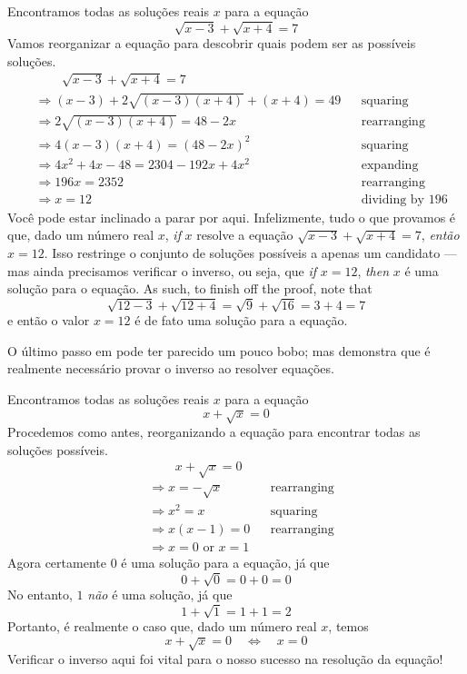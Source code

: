 \begin{estratégia}
\begin{example}
\label{exSolveSqrtFirstExample}
Encontramos todas as soluções reais $x$ para a equação
\[
\sqrt{x-3} + \sqrt{x+4} = 7
\]
Vamos reorganizar a equação para descobrir quais podem ser as possíveis soluções.
\begin{align*}
&\phantom{\Rightarrow\;\;} \sqrt{x-3} + \sqrt{x+4} = 7 && \\
&\Rightarrow (x-3) + 2\sqrt{(x-3)(x+4)} + (x+4) = 49 && \text{squaring} \\
&\Rightarrow 2\sqrt{(x-3)(x+4)} = 48-2x && \text{rearranging} \\
&\Rightarrow 4(x-3)(x+4) = (48-2x)^2 && \text{squaring} \\
&\Rightarrow 4x^2+4x-48 = 2304-192x+4x^2 && \text{expanding} \\
&\Rightarrow 196x = 2352 && \text{rearranging} \\
&\Rightarrow x=12 && \text{dividing by $196$}
\end{align*}
Você pode estar inclinado a parar por aqui. Infelizmente, tudo o que provamos é que, dado um número real $x$, \textit{if} $x$ resolve a equação $\sqrt{x-3} + \sqrt{x+4} = 7$, \textit {então} $x=12$. Isso restringe o conjunto de soluções possíveis a apenas um candidato --- mas ainda precisamos verificar o inverso, ou seja, que \textit{if} $x=12$, \textit{then} $x$ é uma solução para o equação.
As such, to finish off the proof, note that
\[
\sqrt{12-3} + \sqrt{12+4} = \sqrt{9} + \sqrt{16} = 3 + 4 = 7
\]
e então o valor $x=12$ é de fato uma solução para a equação.
\end{example}

O último passo em  pode ter parecido um pouco bobo; mas  demonstra que é realmente necessário provar o inverso ao resolver equações.

\begin{example}
\label{exSolveSqrtSecondExample}
Encontramos todas as soluções reais $x$ para a equação
\[
x+\sqrt{x}=0
\]
Procedemos como antes, reorganizando a equação para encontrar todas as soluções possíveis.
\begin{align*}
&\phantom{\Rightarrow\;\;} x+\sqrt{x} = 0 && \\
&\Rightarrow x=-\sqrt{x} && \text{rearranging} \\
&\Rightarrow x^2=x && \text{squaring} \\
&\Rightarrow x(x-1)=0 && \text{rearranging} \\
&\Rightarrow x=0 \text{ or } x=1 && 
\end{align*}
Agora certamente $0$ é uma solução para a equação, já que
\[
0+\sqrt{0} = 0+0 = 0
\]
No entanto, $1$ \textit{não} é uma solução, já que
\[
1+\sqrt{1} = 1+1 = 2
\]
Portanto, é realmente o caso que, dado um número real $x$, temos
\[
x+\sqrt{x} = 0 \quad \Leftrightarrow \quad x=0
\]
Verificar o inverso aqui foi vital para o nosso sucesso na resolução da equação!
\end{example}


\end{estratégia}

